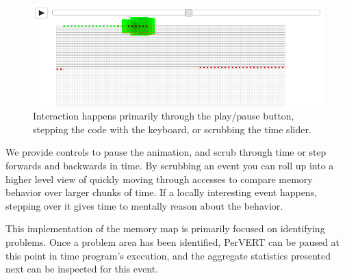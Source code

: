 \documentclass[annual]{acmsiggraph}
\begin{document}
      \begin{figure}[t]
  		\centering
      \includegraphics[scale=0.40]{images/array_fireworks.png}
  		\caption{Interaction happens primarily through the play/pause button, stepping the code with the keyboard, or scrubbing the time slider.}
      \label{fig:fireworks}
  	\end{figure}

    
    We provide controls to pause the animation, and scrub through time or step forwards and backwards in time. By scrubbing an event you can roll up into a higher level view of quickly moving through accesses to compare memory behavior over larger chunks of time. If a locally interesting event happens, stepping over it gives time to mentally reason about the behavior.
    
    This implementation of the memory map is primarily focused on identifying problems. Once a problem area has been identified, PerVERT can be paused at this point in time program's execution, and the aggregate statistics presented next can be inspected for this event.
  
\end{document}
